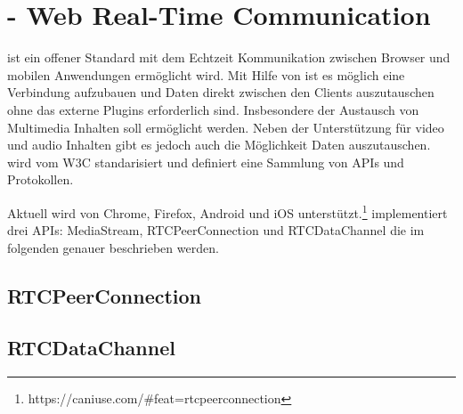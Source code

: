 \section{\webrtc - Web Real-Time Communication}

\webrtc ist ein offener Standard mit dem Echtzeit Kommunikation zwischen Browser und mobilen Anwendungen ermöglicht wird. Mit Hilfe von \webrtc ist es möglich eine \pTp Verbindung aufzubauen und Daten direkt zwischen den Clients auszutauschen ohne das externe Plugins erforderlich sind. Insbesondere der Austausch von Multimedia Inhalten soll ermöglicht werden. Neben der Unterstützung für video und audio Inhalten gibt es jedoch auch die Möglichkeit Daten auszutauschen. \webrtc wird vom W3C\cite{w3Webrtc} standarisiert und definiert eine Sammlung von APIs und Protokollen. 


Aktuell wird \webrtc von Chrome, Firefox, Android und iOS unterstützt.\footnote{https://caniuse.com/\#feat=rtcpeerconnection} \webrtc implementiert drei APIs: MediaStream, RTCPeerConnection und RTCDataChannel die im folgenden genauer beschrieben werden.





\subsection{RTCPeerConnection}


\subsection{RTCDataChannel}



